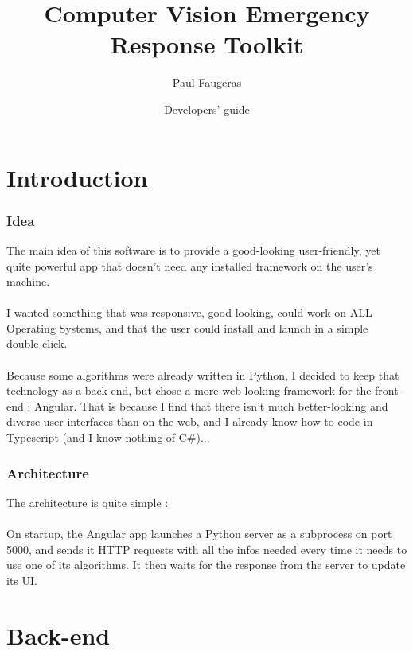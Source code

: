 \documentclass[12pt,a4paper]{article}
\author{Paul Faugeras}
\date{Developers' guide}
\title{Computer Vision Emergency Response Toolkit}
\begin{document}
\pagebreak

\begin{LARGE}
	\maketitle
\end{LARGE}

\pagebreak

\tableofcontents

\pagebreak

\part{Introduction}
\setcounter{section}{0}

\section{Idea}

The main idea of this software is to provide a good-looking user-friendly, yet quite powerful app that doesn't need any installed framework on the user's machine.\\
~\\
I wanted something that was responsive, good-looking, could work on ALL Operating Systems, and that the user could install and launch in a simple double-click.\\
~\\
Because some algorithms were already written in Python, I decided to keep that technology as a back-end, but chose a more web-looking framework for the front-end : Angular. That is because I find that there isn't much better-looking and diverse user interfaces than on the web, and I already know how to code in Typescript (and I know nothing of C\#)...

\section{Architecture}
The architecture is quite simple :\\
~\\
On startup, the Angular app launches a Python server as a subprocess on port 5000, and sends it HTTP requests with all the infos needed every time it needs to use one of its algorithms. It then waits for the response from the server to update its UI.

\pagebreak

\part{Back-end}
\setcounter{section}{0}
\end{document}
